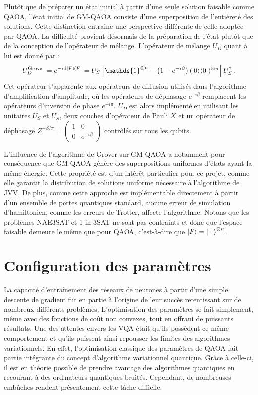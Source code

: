 Plutôt que de préparer un état initial à partir d'une seule solution faisable comme QAOA, l'état initial de GM-QAOA consiste d'une superposition de l'entièreté des solutions. Cette distinction entraine une perspective différente de celle adoptée par QAOA. La difficulté provient désormais de la préparation de l'état plutôt que de la conception de l'opérateur de mélange. L'opérateur de mélange $U_{D}$ quant à lui est donné par :
\begin{equation}
    U_D^{\mathrm{Grover}} = e^{-i \beta \ket{F}\!\bra{F}} = U_{S}\left[ \mathds{1}^{\otimes n} -\left(1-e^{-i \beta}\right) (\ket{0}\!\bra{0})^{\otimes n} \right] U_{S}^{\dagger} \,.
\end{equation}
Cet opérateur s'apparente aux opérateurs de diffusion utilisés dans l'algorithme d'amplification d'amplitude, où les opérateurs de déphasage $e^{-i\beta}$ remplacent les opérateurs d'inversion de phase $e^{-i \pi}$. $U_{D}$ est alors implémenté en utilisant les unitaires $U_{S}$ et $U_{S}^{\dagger}$, deux couches d'opérateur de Pauli $X$ et un opérateur de déphasage $Z^{-\beta/\pi} = \begin{pmatrix}
1 & 0 \\
0 & e^{-i\beta}
\end{pmatrix}$ contrôlés sur tous les qubits.

L'influence de l'algorithme de Grover sur GM-QAOA a notamment pour conséquence que GM-QAOA génère des superpositions uniformes d'états ayant la même énergie. Cette propriété est d'un intérêt particulier pour ce projet, comme elle garantit la distribution de solutions uniforme nécessaire à l'algorithme de JVV. De plus, comme cette approche est implémentable directement à partir d'un ensemble de portes quantiques standard, aucune erreur de simulation d'hamiltonien, comme les erreurs de Trotter, affecte l'algorithme. Notons que les problèmes NAE3SAT et 1-in-3SAT ne sont pas contraints et donc que l'espace faisable demeure le même que pour QAOA, c'est-à-dire que $\ket{F} = \ket{+}^{\otimes n}$.


\section{Configuration des paramètres}
\label{subsec:configuration-des-parametres}

La capacité d'entraînement des réseaux de neurones à partir d'une simple descente de gradient fut en partie à l'origine de leur succès retentissant sur de nombreux différents problèmes. L'optimisation des paramètres se fait simplement, même avec des fonctions de coût non convexes, tout en offrant de puissants résultats. Une des attentes envers les VQA était qu'ils possèdent ce même comportement et qu'ils puissent ainsi repousser les limites des algorithmes variationnels. En effet, l'optimisation classique des paramètres de QAOA fait partie intégrante du concept d'algorithme variationnel quantique. Grâce à celle-ci, il est en théorie possible de prendre avantage des algorithmes quantiques en recourant à des ordinateurs quantiques bruités. Cependant, de nombreuses embûches rendent présentement cette tâche difficile. 

